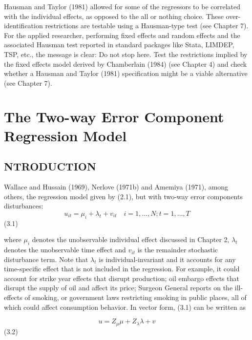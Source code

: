 \documentclass[
]{book}
\begin{document}
Hausman and Taylor (1981) allowed for some of the regressors to be correlated with the individual effects, as opposed to the all or nothing choice. These over-identification restrictions are testable using a Hausman-type test (see Chapter 7). For the applied researcher, performing fixed effects and random effects and the associated Hausman test reported in standard packages like Stata, LIMDEP, TSP, etc., the message is clear: Do not stop here. Test the restrictions implied by the fixed effects model derived by Chamberlain (1984) (see Chapter 4) and check whether a Hausman and Taylor (1981) specification might be a viable alternative (see Chapter 7).

\hypertarget{the-two-way-error-component-regression-model}{%
\chapter{The Two-way Error Component Regression Model}\label{the-two-way-error-component-regression-model}}

\hypertarget{ntroduction}{%
\section{NTRODUCTION}\label{ntroduction}}

Wallace and Hussain (1969), Nerlove (1971b) and Amemiya (1971), among others, the regression model given by (2.1), but with two-way error components disturbances: \begin{equation}
u_{i t}=\mu_{i}+\lambda_{t}+v_{i t} \quad i=1, \ldots, N ; t=1, \ldots, T
\end{equation} (3.1)

where \(\mu_i\) denotes the unobservable individual effect discussed in Chapter 2, \(\lambda_t\) denotes the unobservable time effect and \(v_{it}\) is the remainder stochastic disturbance term. Note that \(\lambda_t\) is individual-invariant and it accounts for any time-specific effect that is not included in the regression. For example, it could account for strike year effects that disrupt production; oil embargo effects that disrupt the supply of oil and affect its price; Surgeon General reports on the ill-effects of smoking, or government laws restricting smoking in public places, all of which could affect consumption behavior. In vector form, (3.1) can be written as

\begin{equation}
u=Z_{\mu} \mu+Z_{\lambda} \lambda+v
\end{equation} (3.2)
\end{document}
